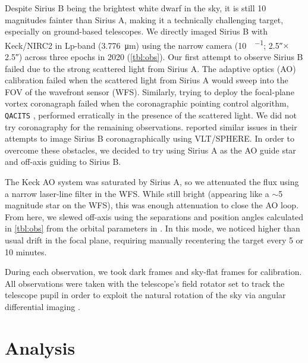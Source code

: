 \documentclass[twocolumn,linenumbers]{aastex631}
\begin{document}
Despite Sirius B being the brightest white dwarf in the sky, it is still 10 magnitudes fainter than Sirius A, making it a technically challenging target, especially on ground-based telescopes. We directly imaged Sirius B with Keck/NIRC2 in Lp-band (\qty{3.776}{\micro\meter}) using the narrow camera (\qty{10}{\milliarcsecond\per\pixel}; \ang{;;2.5}$\times$\ang{;;2.5}) across three epochs in 2020 (\cref{tbl:obs}). Our first attempt to observe Sirius B failed due to the strong scattered light from Sirius A. The adaptive optics (AO) calibration failed when the scattered light from Sirius A would sweep into the FOV of the wavefront sensor (WFS). Similarly, trying to deploy the focal-plane vortex coronagraph \citep{serabyn_w_2017} failed when the coronagraphic pointing control algorithm, \texttt{QACITS} \citep{huby_w_2017}, performed erratically in the presence of the scattered light. We did not try coronagraphy for the remaining observations. \citet[\S2]{vigan_high-contrast_2015} reported similar issues in their attempts to image Sirius B coronagraphically using VLT/SPHERE. In order to overcome these obstacles, we decided to try using Sirius A as the AO guide star and off-axis guiding to Sirius B.

The Keck AO system \citep{wizinowich_performance_2000} was saturated by Sirius A, so we attenuated the flux using a narrow laser-line filter in the WFS. While still bright (appearing like a $\sim$5 magnitude star on the WFS), this was enough attenuation to close the AO loop. From here, we slewed off-axis using the separations and position angles calculated in \cref{tbl:obs} from the orbital parameters in \citet{bond_sirius_2017}. In this mode, we noticed higher than usual drift in the focal plane, requiring manually recentering the target every 5 or 10 minutes.

During each observation, we took dark frames and sky-flat frames for calibration. All observations were taken with the telescope's field rotator set to track the telescope pupil in order to exploit the natural rotation of the sky via angular differential imaging \citep[ADI;][]{marois_angular_2006}.

\section{Analysis} \label{sec:analysis}
\end{document}
